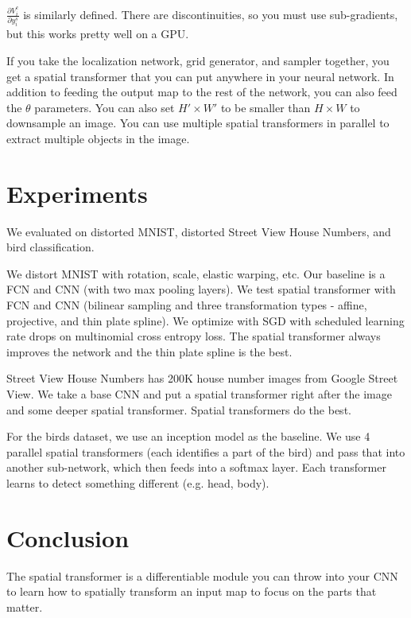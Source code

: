 \documentclass[a4paper]{article}
\begin{document}
$\frac{\partial V_i^c}{\partial y_i^s}$ is similarly defined. There are
discontinuities, so you must use sub-gradients, but this works pretty well on
a GPU.

If you take the localization network, grid generator, and sampler together,
you get a spatial transformer that you can put anywhere in your neural network.
In addition to feeding the output map to the rest of the network, you can also
feed the $\theta$ parameters. You can also set $H' \times W'$ to be smaller 
than $H \times W$ to downsample an image. You can use multiple spatial
transformers in parallel to extract multiple objects in the image.

\section{Experiments}
We evaluated on distorted MNIST, distorted Street View House Numbers, and bird
classification.

We distort MNIST with rotation, scale, elastic warping, etc. Our baseline is a
FCN and CNN (with two max pooling layers). We test spatial transformer with
FCN and CNN (bilinear sampling and three transformation types - affine, 
projective, and thin plate spline). We optimize with SGD with scheduled
learning rate drops on multinomial cross entropy loss. The spatial transformer
always improves the network and the thin plate spline is the best.

Street View House Numbers has 200K house number images from Google Street View.
We take a base CNN and put a spatial transformer right after the image and
some deeper spatial transformer. Spatial transformers do the best.

For the birds dataset, we use an inception model as the baseline. We use 4
parallel spatial transformers (each identifies a part of the bird) and pass that
into another sub-network, which then feeds into a softmax layer. Each
transformer learns to detect something different (e.g. head, body).

\section{Conclusion}
The spatial transformer is a differentiable module you can throw into your CNN
to learn how to spatially transform an input map to focus on the parts that
matter.
\end{document}
